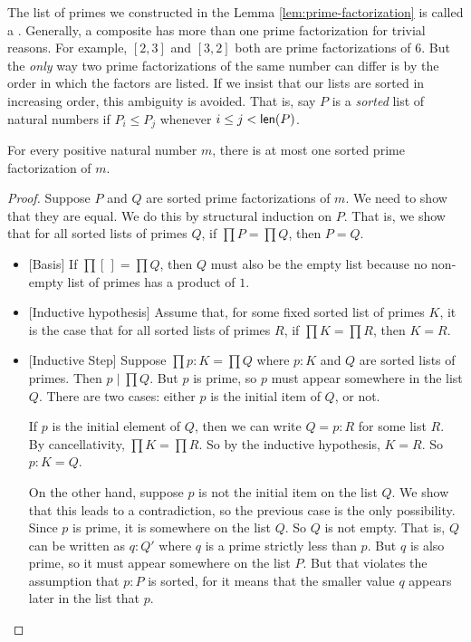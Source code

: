 The list of primes we constructed in the Lemma \ref{lem:prime-factorization} is
called a . Generally, a composite has
more than one prime factorization for trivial reasons. For example, 
$[2,3]$ and $[3,2]$ both are prime factorizations of $6$. But the \emph{only} way 
two prime factorizations of the same number can differ is by the order 
in which the factors are listed. 
If we insist that our lists are sorted in increasing order, this ambiguity is avoided. 
That is, say $P$ is a \emph{sorted} list of natural numbers if $P_i\leq P_j$ whenever $i\leq j <\mathord{\textsf{len}}(P)$.

\begin{lem}
For every positive natural number $m$, there is at most one sorted prime factorization of $m$.
\begin{proof}
Suppose $P$ and $Q$ are sorted prime factorizations of $m$. We need to show that they are equal.
We do this by structural induction on $P$. That is, we show that for all sorted lists of primes $Q$, 
if $\prod P = \prod Q$, then $P=Q$.
\begin{itemize}
\item{}[Basis] If $\prod [\,] = \prod Q$,
then $Q$ must also be the empty list because no non-empty list of primes has a
product of $1$.
\item{}[Inductive hypothesis] Assume that, for some fixed sorted list of primes $K$, it is the case that
for all sorted lists of primes $R$, if $\prod K = \prod R$, then $K=R$.
\item{}[Inductive Step] Suppose $\prod p:K = \prod Q$ where $p:K$ and $Q$ are
sorted lists of primes. Then $p\mid \prod Q$.
But $p$ is prime, so $p$ must appear somewhere in the list $Q$. There are two cases:
either $p$ is the initial item of $Q$, or not.

If $p$ is the initial element of $Q$, then we can write $Q = p:R$ for some list $R$.
By cancellativity, $\prod K = \prod R$. So by the inductive hypothesis, $K = R$.
So $p:K = Q$.

On the other hand, suppose $p$ is not the initial item on the list $Q$. We show that this leads to a contradiction, so the previous case is
the only possibility. Since $p$ is prime, it is somewhere on the list $Q$. So $Q$ is not empty. That is,
$Q$ can be written as $q:Q'$
where $q$ is a prime strictly less than $p$. But $q$ is also prime, so it must appear somewhere on the list $P$. But that violates
the assumption that $p:P$ is sorted, for it means that the smaller value $q$ appears later in the list that $p$.  
\end{itemize}
\end{proof}
\end{lem}

